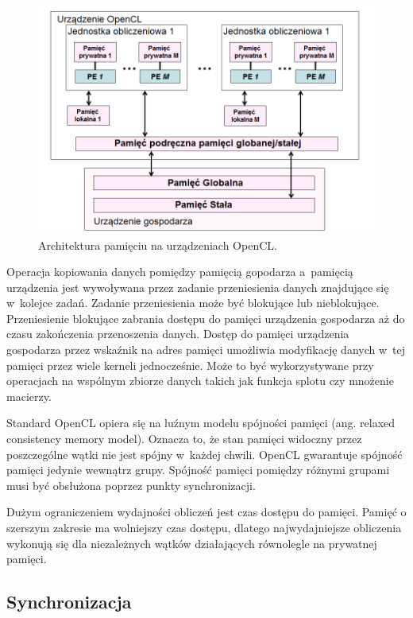 \begin{figure}[h]
        \centering
                \centering
                \includegraphics[width=12cm]{architekturapamieci}
	\caption{Architektura pamięciu na urządzeniach OpenCL.}
\end{figure}

Operacja kopiowania danych pomiędzy pamięcią gopodarza a~pamięcią urządzenia jest wywoływana przez zadanie przeniesienia danych znajdujące się w~kolejce zadań. Zadanie przeniesienia może być blokujące lub nieblokujące. Przeniesienie blokujące zabrania dostępu do pamięci urządzenia gospodarza aż do czasu zakończenia przenoszenia danych. Dostęp do pamięci urządzenia gospodarza przez wskaźnik na adres pamięci umożliwia modyfikację danych w~tej pamięci przez wiele kerneli jednocześnie. Może to być wykorzystywane przy operacjach na wspólnym zbiorze danych takich jak funkcja splotu czy mnożenie macierzy.

Standard OpenCL opiera się na luźnym modelu spójności pamięci (ang. relaxed consistency memory model). Oznacza to, że stan pamięci widoczny przez poszczególne wątki nie jest spójny w~każdej chwili. OpenCL gwarantuje spójność pamięci jedynie wewnątrz grupy. Spójność pamięci pomiędzy różnymi grupami musi być obsłużona poprzez punkty synchronizacji.

Dużym ograniczeniem wydajności obliczeń jest czas dostępu do pamięci. Pamięć o szerszym zakresie ma wolniejszy czas dostępu, dlatego najwydajniejsze obliczenia wykonują się dla niezależnych wątków działających równolegle na prywatnej pamięci.


\subsection{Synchronizacja}\label{sec:OpenC61L}

